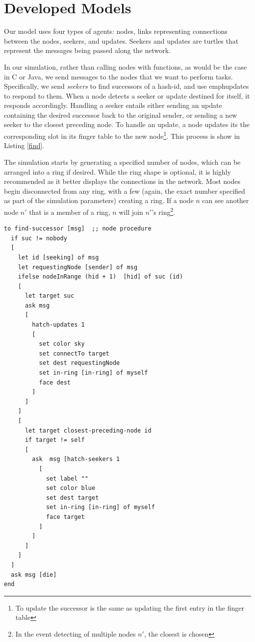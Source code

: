\documentclass[12pt]{ieeetran} %
\begin{document}
\section{Developed Models}

Our model uses four types of agents: nodes, links representing connections between the nodes, seekers, and updates.  Seekers and updates are turtles that represent the messages being passed along the network.

In our simulation, rather than calling nodes with functions, as would be the case in C or Java, we send messages to the nodes that we want to perform tasks. Specifically, we send \emph{seekers} to find successors of a hash-id, and use emph{updates} to respond to them.  When a node detects a seeker or update destined for itself, it responds accordingly.  Handling a seeker entails either sending an update containing the desired successor back to the original sender, or sending a new seeker to the closest preceding node.  To handle an update, a node updates its the corresponding slot in its finger table to the new node\footnote{To update the successor is the same as updating the first entry in the finger table}.  This process is show in Listing \ref{find}.





The simulation starts by generating a specified number of nodes, which can be arranged into a ring if desired.  While the ring shape is optional, it is highly recommended as it better displays the connections in the network.  Most nodes begin disconnected from any ring, with a few (again, the exact number specified as part of the simulation parameters) creating a ring.  If a node $n$ can see another node $n'$ that is a member of a ring, $n$ will join  $n'$'s ring\footnote{In the event detecting of multiple nodes $n'$, the closest is chosen}. 


\begin{lstlisting}[label=find, caption={Netlogo implementation of finding a key.}]
to find-successor [msg]  ;; node procedure
  if suc != nobody
  [
    let id [seeking] of msg
    let requestingNode [sender] of msg
    ifelse nodeInRange (hid + 1)  [hid] of suc (id)
    [
      let target suc
      ask msg 
      [
        hatch-updates 1 
        [
          set color sky
          set connectTo target
          set dest requestingNode
          set in-ring [in-ring] of myself
          face dest
        ]
      ]
    ]
    [
      let target closest-preceding-node id
      if target != self
      [ 
        ask  msg [hatch-seekers 1 
          [
            set label ""
            set color blue
            set dest target
            set in-ring [in-ring] of myself
            face target
          ]
        ]
      ] 
    ]
  ]
  ask msg [die]
end
\end{lstlisting}
\end{document}
